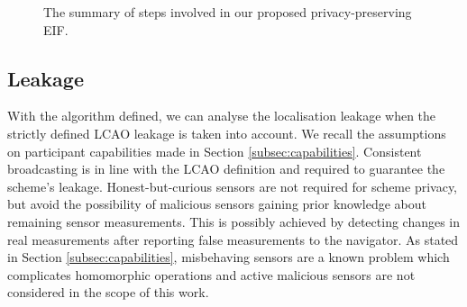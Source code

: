 \documentclass[10pt,journal,compsoc]{IEEEtran}
\theoremstyle{definition}
\theoremstyle{definition}
\theoremstyle{remark}
\begin{document}
\begin{figure}[htbp]
\vspace{\baselineskip}
\caption{The summary of steps involved in our proposed privacy-preserving EIF.}
\label{fig:alg_steps}
\end{figure}

% 
% 

\subsection{Leakage} \label{subsec:leakage}
With the algorithm defined, we can analyse the localisation leakage when the strictly defined LCAO leakage is taken into account. We recall the assumptions on participant capabilities made in Section \ref{subsec:capabilities}. Consistent broadcasting is in line with the LCAO definition and required to guarantee the scheme's leakage. Honest-but-curious sensors are not required for scheme privacy, but avoid the possibility of malicious sensors gaining prior knowledge about remaining sensor measurements. This is possibly achieved by detecting changes in real measurements after reporting false measurements to the navigator. As stated in Section \ref{subsec:capabilities}, misbehaving sensors are a known problem which complicates homomorphic operations and active malicious sensors are not considered in the scope of this work.
\end{document}
